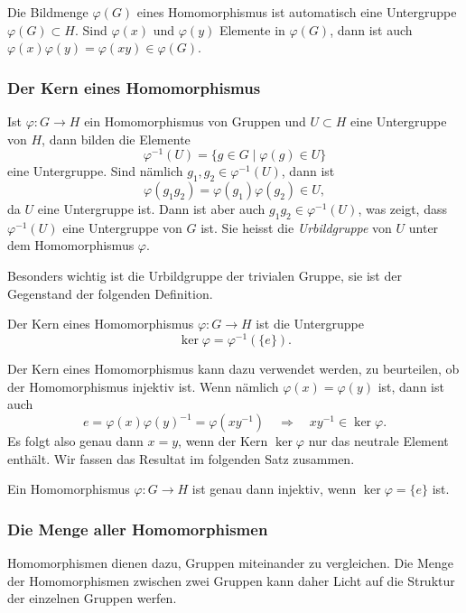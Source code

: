 Die Bildmenge $\varphi(G)$ eines Homomorphismus ist automatisch eine
Untergruppe $\varphi(G)\subset H$.
Sind $\varphi(x)$ und $\varphi(y)$ Elemente in $\varphi(G)$,
dann ist auch $\varphi(x)\varphi(y)=\varphi(xy)\in\varphi(G)$.

%
%
\subsubsection{Der Kern eines Homomorphismus}
Ist $\varphi\colon G\to H$ ein Homomorphismus von Gruppen und
$U\subset H$ eine Untergruppe von $H$, dann bilden die Elemente
\[
\varphi^{-1}(U)
=
\{g\in G\mid \varphi(g)\in U\}
\]
eine Untergruppe.
Sind nämlich $g_1,g_2\in\varphi^{-1}(U)$, dann ist
\[
\varphi(g_1g_2)
=
\varphi(g_1)\varphi(g_2)
\in U,
\]
da $U$ eine Untergruppe ist.
Dann ist aber auch $g_1g_2\in\varphi^{-1}(U)$, was zeigt, dass
$\varphi^{-1}(U)$ eine Untergruppe von $G$ ist.
Sie heisst die {\em Urbildgruppe} von $U$ unter dem Homomorphismus
$\varphi$.

Besonders wichtig ist die Urbildgruppe der trivialen Gruppe,
sie ist der Gegenstand der folgenden Definition.

\begin{definition}[Kern]
\label{buch:gruppen:definition:def:kern}
Der Kern eines Homomorphismus $\varphi \colon G\to H$ ist die
Untergruppe
\[
\ker \varphi = \varphi^{-1}(\{e\}).
\]
\end{definition}

Der Kern eines Homomorphismus kann dazu verwendet werden, zu beurteilen,
ob der Homomorphismus injektiv ist.
Wenn nämlich $\varphi(x)=\varphi(y)$ ist, dann ist auch
\[
e
=
\varphi(x)\varphi(y)^{-1}
=
\varphi(xy^{-1})
\quad\Rightarrow\quad
xy^{-1} \in\ker\varphi.
\]
Es folgt also genau dann $x=y$, wenn der Kern $\ker\varphi$ nur
das neutrale Element enthält.
Wir fassen das Resultat im folgenden Satz zusammen.

\begin{satz}
Ein Homomorphismus $\varphi\colon G\to H$ ist genau dann injektiv,
wenn $\ker\varphi=\{e\}$ ist.
\end{satz}

%
%
\subsubsection{Die Menge aller Homomorphismen}
Homomorphismen dienen dazu, Gruppen miteinander zu vergleichen.
Die Menge der Homomorphismen zwischen zwei Gruppen kann daher
Licht auf die Struktur der einzelnen Gruppen werfen.

